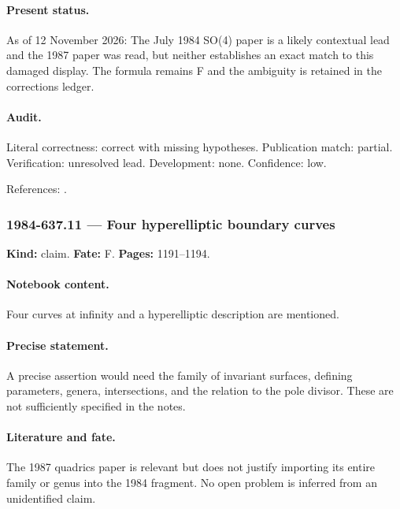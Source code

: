 \paragraph{Present status.} As of 12 November 2026: The July 1984 SO(4) paper is a likely contextual lead and the 1987 paper was read, but neither establishes an exact match to this damaged display. The formula remains F and the ambiguity is retained in the corrections ledger.

\paragraph{Audit.} Literal correctness: correct with missing hypotheses. Publication match: partial. Verification: unresolved lead. Development: none. Confidence: low.

\noindent References: \citep{adler1984geodesic,adler1987quadrics}.\par

\subsubsection{1984-637.11 --- Four hyperelliptic boundary curves}

\label{item:1984-637.11}

\noindent\textbf{Kind:} claim. \textbf{Fate:} F. \textbf{Pages:} 1191--1194.\par

\paragraph{Notebook content.} Four curves at infinity and a hyperelliptic description are mentioned.

\paragraph{Precise statement.} A precise assertion would need the family of invariant surfaces, defining parameters, genera, intersections, and the relation to the pole divisor. These are not sufficiently specified in the notes.

\paragraph{Literature and fate.} The 1987 quadrics paper is relevant but does not justify importing its entire family or genus into the 1984 fragment. No open problem is inferred from an unidentified claim.

